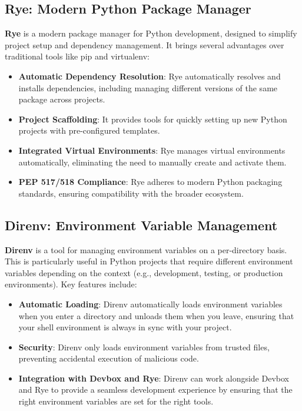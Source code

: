 \subsection{Rye: Modern Python Package Manager}

\textbf{Rye} is a modern package manager for Python development, designed to simplify project setup and dependency management. It brings several advantages over traditional tools like pip and virtualenv:

\begin{itemize}
    \item \textbf{Automatic Dependency Resolution}: Rye automatically resolves and installs dependencies, including managing different versions of the same package across projects.
    \item \textbf{Project Scaffolding}: It provides tools for quickly setting up new Python projects with pre-configured templates.
    \item \textbf{Integrated Virtual Environments}: Rye manages virtual environments automatically, eliminating the need to manually create and activate them.
    \item \textbf{PEP 517/518 Compliance}: Rye adheres to modern Python packaging standards, ensuring compatibility with the broader ecosystem.
\end{itemize}

\subsection{Direnv: Environment Variable Management}

\textbf{Direnv} is a tool for managing environment variables on a per-directory basis. This is particularly useful in Python projects that require different environment variables depending on the context (e.g., development, testing, or production environments). Key features include:

\begin{itemize}
    \item \textbf{Automatic Loading}: Direnv automatically loads environment variables when you enter a directory and unloads them when you leave, ensuring that your shell environment is always in sync with your project.
    \item \textbf{Security}: Direnv only loads environment variables from trusted files, preventing accidental execution of malicious code.
    \item \textbf{Integration with Devbox and Rye}: Direnv can work alongside Devbox and Rye to provide a seamless development experience by ensuring that the right environment variables are set for the right tools.
\end{itemize}

